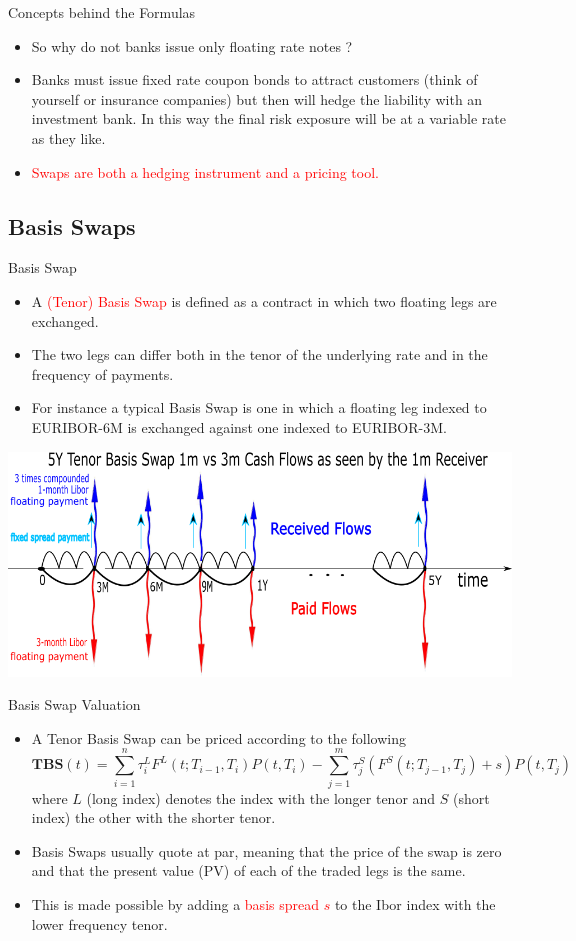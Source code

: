 \documentclass{beamer}
\begin{document}
\begin{frame}{Concepts behind the Formulas}
	\begin{itemize}
		\item<1-> So why do not banks issue only floating rate notes ?
		\item<2-> Banks must issue fixed rate coupon bonds to attract customers (think of yourself or insurance companies) but then will hedge the liability  with an investment bank. In this way the final risk exposure will be at a variable rate as they like. 
		\item<3-> \textcolor{red}{Swaps are both a hedging instrument and a pricing tool.}
	\end{itemize}
\end{frame}

\subsection{Basis Swaps}
\begin{frame}{Basis Swap}
	\begin{itemize}
	\item A \textcolor{red}{(Tenor) Basis Swap} is defined as a contract in which two floating legs are exchanged.
	\item The two legs can differ both in the tenor of the underlying rate and in the frequency of payments.
	\item For instance a typical Basis Swap is one in which a floating leg indexed to EURIBOR-6M is exchanged against one indexed to EURIBOR-3M.
	\end{itemize}
	\begin{center}
		\includegraphics[width=0.5\linewidth]{tenor_basis_swap}
	\end{center}
\end{frame}

\begin{frame}{Basis Swap Valuation}
\begin{itemize}
	\item<1-> A Tenor Basis Swap can be priced according to the following
	\begin{equation}
	\boxed{\textbf{TBS}(t) = \sum_{i=1}^n \tau_i^{L} F^{L}(t;T_{i-1},T_i)P(t,T_i) - \sum_{j=1}^m \tau_j^{S} (F^{S}(t;T_{j-1},T_j)+s)P(t,T_j)}
	\end{equation}
	where $L$ (long index) denotes the index with the longer tenor and $S$ (short index) the other with the shorter tenor.
	\item<2-> Basis Swaps usually quote at par, meaning that the price of the swap is zero and that the present value (PV) of each of the traded legs is the same. 
	\item<3-> This is made possible by adding a \textcolor{red}{basis spread $s$} to the Ibor index with the lower frequency tenor.
	\end{itemize}
\end{frame}
\end{document}
